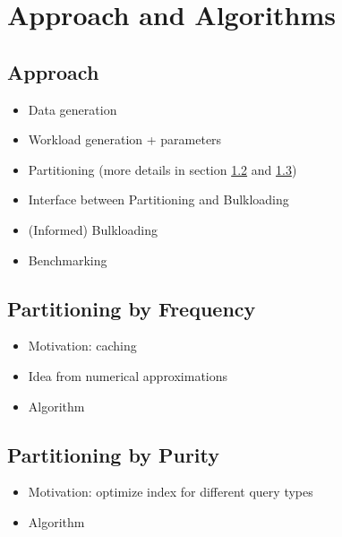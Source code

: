 \thispagestyle{plain}
\chapter{Approach and Algorithms}

\section{Approach}
\begin{itemize}
    \item Data generation
    \item Workload generation + parameters
    \item Partitioning (more details in section \ref{Frequency} and \ref{Purity})
    \item Interface between Partitioning and Bulkloading
    \item (Informed) Bulkloading
    \item Benchmarking
\end{itemize}

\section{Partitioning by Frequency} \label{Frequency}
\begin{itemize}
    \item Motivation: caching
    \item Idea from numerical approximations
    \item Algorithm
\end{itemize}

\section{Partitioning by Purity} \label{Purity}
\begin{itemize}
    \item Motivation: optimize index for different query types
    \item Algorithm
\end{itemize}
